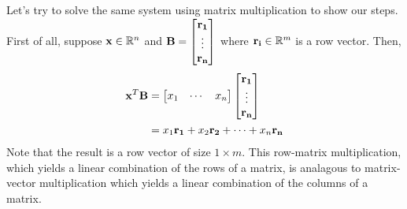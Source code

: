 \documentclass[../main.tex]{subfiles}
\begin{document}
Let's try to solve the same system using matrix multiplication to show our steps.
First of all, suppose $\mathbf{x} \in \mathbb{R}^n$ and $\mathbf{B}=\begin{bmatrix}\mathbf{r_1}\\\vdots\\\mathbf{r_n}\end{bmatrix}$
where $\mathbf{r_i} \in \mathbb{R}^m$ is a row vector. Then,
\begin{align*}
	\mathbf{x}^T\mathbf{B} & =\begin{bmatrix}x_1&\cdots&x_n\end{bmatrix}\begin{bmatrix}\mathbf{r_1}\\\vdots\\\mathbf{r_n}\end{bmatrix} \\
	                   & =x_1\mathbf{r_1}+x_2\mathbf{r_2}+\cdots +x_n\mathbf{r_n}
\end{align*}
Note that the result is a row vector of size $1\times m$. This row-matrix
multiplication, which yields a linear combination of the rows of a matrix,
is analagous to matrix-vector multiplication which yields a linear
combination of the columns of a matrix.
\end{document}
